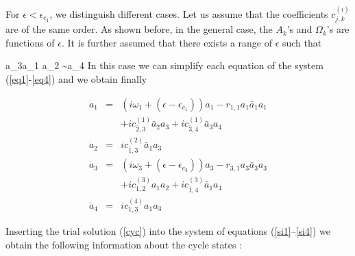 For $\epsilon<\epsilon_{c_1}$, we distinguish different cases.
Let us assume that the coefficients $c^{(i)}_{j,k}$ are of the same order.
As shown before, in the general case, the $A_k$'s and $\Omega_k$'s
are functions of $\epsilon$.
It is further assumed that there exists a range of
$\epsilon$ such that 

\beq\label{order}
a_3\gg a_1 \gg a_2 \sim a_4
\eeq
In this case we can simplify each equation of the system 
(\ref{eq1}-\ref{eq4})
and we obtain finally



\begin{eqnarray}
\dot{a}_1&=&(i\omega_1+(\epsilon-\epsilon_{c_1}))a_1-r_{1,1}a_1\bar{a}_1a_1\nonumber\\
&&+ic^{(1)}_{\bar{2},3}\bar{a}_2{a}_3+ic^{(1)}_{\bar{3},4}\bar{a}_3a_4\label{si1}\\
\dot{a}_2&=&ic^{(2)}_{\bar{1},3}\bar{a}_1{a}_3\label{si2}\\
\dot{a}_3&=&(i\omega_3+(\epsilon-\epsilon_{c_3}))a_3-r_{3,1}a_3\bar{a}_3a_3\nonumber\\
&&+ic^{(3)}_{1,2}a_1a_2+ic^{(3)}_{\bar{1},4}\bar{a}_1a_4\label{si3}\\
\dot{a}_4&=&ic^{(4)}_{1,3}a_1a_3\label{si4}
\end{eqnarray}

Inserting the trial solution (\ref{cyc}) into 
the system of equations (\ref{si1}--\ref{si4}) we obtain the following
information about the cycle states :

